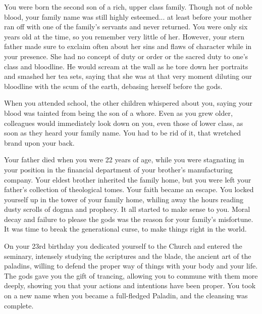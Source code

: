 \documentclass[char]{guildcamp3}
\begin{document}
\name{\cPaladin{}}


You were born the second son of a rich, upper class family. Though not of noble blood, your family name was still highly esteemed... at least before your mother ran off with one of the family's servants and never returned. You were only six years old at the time, so you remember very little of her. However, your stern father made sure to exclaim often about her sins and flaws of character while in your presence. She had no concept of duty or order or the sacred duty to one's class and bloodline. He would scream at the wall as he tore down her portraits and smashed her tea sets, saying that she was at that very moment diluting our bloodline with the scum of the earth, debasing herself before the gods.

When you attended school, the other children whispered about you, saying your blood was tainted from being the son of a whore. Even as you grew older, colleagues would immediately look down on you, even those of lower class, as soon as they heard your family name. You had to be rid of it, that wretched brand upon your back.

Your father died when you were 22 years of age, while you were stagnating in your position in the financial department of your brother's manufacturing company. Your eldest brother inherited the family home, but you were left your father's collection of theological tomes. Your faith became an escape. You locked yourself up in the tower of your family home, whiling away the hours reading dusty scrolls of dogma and prophecy. It all started to make sense to you. Moral decay and failure to please the gods was the reason for your family's misfortune. It was time to break the generational curse, to make things right in the world.

On your 23rd birthday you dedicated yourself to the Church and entered the seminary, intensely studying the scriptures and the blade, the ancient art of the paladins, willing to defend the proper way of things with your body and your life. The gods gave you the gift of trancing, allowing you to commune with them more deeply, showing you that your actions and intentions have been proper. You took on a new name when you became a full-fledged Paladin, and the cleansing was complete.
\end{document}

